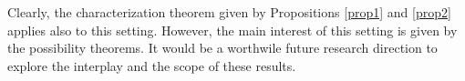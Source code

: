 \documentclass{llncs}
\numberwithin{equation}{section}
\begin{document}
Clearly, the characterization theorem given by Propositions \ref{prop1} and \ref{prop2} applies also to this setting. However, the main interest of this setting is given by the possibility theorems. It would be a worthwile future research direction to explore the interplay and the scope of these results.

\begin{comment}

\subsection{Comparison with other approaches}

Dietrich \cite{Di07} proposes a general model for judgment aggregation, which can be applied to general logic, including classical propositional logic, predicate logic, modal or conditional logics, and some multi-valued or fuzzy logics, as well as giving generalised impossibility theorems. In \cite{Di10}, Dietrich shows that impossibility results do not apply to a wide class of realistic agendas once propositions of the form `if  then ' are  modelled as {\em subjunctive} implications rather than material implications. Since both Dietrich's methodology and our methodology provide a uniform way to deal with judgment aggregation problems, it is worthwhile to compare his methodology with ours.

\subsubsection{Dietrich's methodology}

\texttt{To be added later, since there are too much ingredient, and I do not want the paper to contain 10 pages of definitions......}








\subsubsection{A comparison between the two methodologies}

As we can see, the underlying logical backgrounds of Dietrich's approach and our approach are similar in the sense that both approaches treat different logics satisfying certain properties uniformly in an abstract way. However, there are significant differences between the two approaches, which can lead to different results.


\end{comment}
\end{document}
